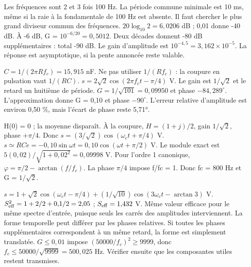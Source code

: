 Les fréquences sont 2 et 3 fois 100 Hz. La période commune minimale est 10 ms, même si la raie à la fondamentale de 100 Hz est absente. Il faut chercher le plus grand diviseur commun des fréquences.
$20\log_{10}2=6{,}0206$ dB ; 0,01 donne -40 dB. À -6 dB, G = $10^{-6/20}=0{,}5012$.
Deux décades donnent -80 dB supplémentaires : total -90 dB. Le gain d’amplitude est $10^{-4{,}5}=3{,}162\times10^{-5}$. La réponse est asymptotique, si la pente annoncée reste valable.


$C=1/(2\pi Rf_c)=15{,}915$ nF. Ne pas utiliser $1/(Rf_c)$ : la coupure en pulsation vaut $1/(RC)$.
$s=2\sqrt2\cos(2\pi f_ct-\pi/4)$ V. Le gain est $1/\sqrt2$ et le retard un huitième de période.
$G=1/\sqrt{101}=0{,}09950$ et phase $-84{,}289^\circ$. L’approximation donne G = 0,10 et phase $-90^\circ$. L’erreur relative d’amplitude est environ 0,50 \%, mais l’écart de phase reste 5,71°.


H(0) = 0 ; la moyenne disparaît. À la coupure, $H=(1+j)/2$, gain $1/\sqrt2$, phase $+\pi/4$. Donc $s=(3/\sqrt2)\cos(\omega_ct+\pi/4)$ V.
$s\simeq RC\dot e=-0{,}10\sin\omega t=0{,}10\cos(\omega t+\pi/2)$ V. Le module exact est $5(0{,}02)/\sqrt{1+0{,}02^2}=0{,}09998$ V.
Pour l’ordre 1 canonique, $\varphi=\pi/2-\arctan(f/f_c)$. La phase $\pi/4$ impose f/fc = 1. Donc fc = 800 Hz et G = $1/\sqrt2$.


$s=1+\sqrt2\cos(\omega_ct-\pi/4)+(1/\sqrt{10})\cos(3\omega_ct-\arctan3)$ V. $S_{\rm eff}^2=1+2/2+0{,}1/2=2{,}05$ ; $S_{\rm eff}=1{,}432$ V.
Même valeur efficace pour le même spectre d’entrée, puisque seuls les carrés des amplitudes interviennent. La forme temporelle peut différer par les phases relatives. Si toutes les phases supplémentaires correspondent à un même retard, la forme est simplement translatée.
$G\leq0{,}01$ impose $(50000/f_c)^2\geq9999$, donc $f_c\leq50000/\sqrt{9999}=500{,}025$ Hz. Vérifier ensuite que les composantes utiles restent transmises.



